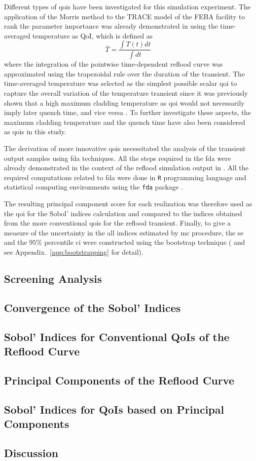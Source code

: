 Different types of \glspl{qoi} have been investigated for this simulation experiment.
The application of the Morris method to the TRACE model of the FEBA facility to rank the parameter importance was already demonstrated in \cite{Wicaksono2014} using the time-averaged temperature as QoI, 
which is defined as
\begin{equation}
	\bar{T} = \frac{\int T(t) dt}{\int dt}
\label{eq:qoi_time_averaged_temperature}
\end{equation}
where the integration of the pointwise time-dependent reflood curve was approximated using the trapezoidal rule over the duration of the transient.
The time-averaged temperature was selected as the simplest possible scalar \gls{qoi} to capture the overall variation of the temperature transient 
since it was previously shown that a high maximum cladding temperature as \gls{qoi} would not necessarily imply later quench time, and vice versa \cite{Wicaksono2014}. 
To further investigate these aspects, the maximum cladding temperature and the quench time have also been considered as \glspl{qoi} in this study.

The derivation of more innovative \glspl{qoi} necessitated the analysis of the transient output samples using \gls{fda} techniques.
All the steps required in the \gls{fda} were already demonstrated in the context of the reflood simulation output in \cite{Wicaksono2014a}.
All the required computations related to \gls{fda} were done in \texttt{R} programming language and statistical computing environments \cite{RCT2017} using the \texttt{fda} package \cite{Ramsay2014}.

The resulting principal component score for each realization was therefore used as the \gls{qoi} for the Sobol' indices calculation and compared to the indices obtained from the more conventional \glspl{qoi} for the reflood transient.
Finally, to give a measure of the uncertainty in the all indices estimated by \gls{mc} procedure, 
the \gls{se} and the $95$\% percentile \gls{ci} were constructed using the bootstrap technique (\cite{Efron1986} and see Appendix.~\ref{app:bootstrapping} for detail).

\subsection{Screening Analysis}

\subsection{Convergence of the Sobol' Indices}

\subsection{Sobol' Indices for Conventional QoIs of the Reflood Curve}

\subsection{Principal Components of the Reflood Curve}

\subsection{Sobol' Indices for QoIs based on Principal Components}

\subsection{Discussion}